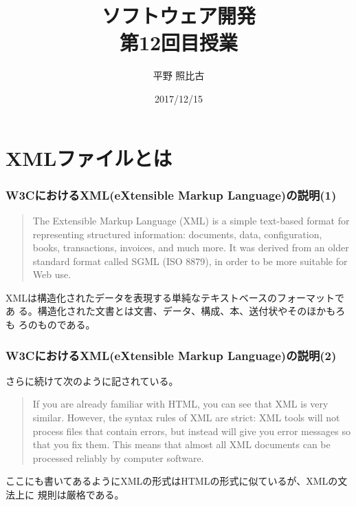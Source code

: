 
\title{ソフトウェア開発\\第12回目授業}
\author{平野 照比古}
\institute{}
\date{2017/12/15}
\newtheorem{Prob}{解説}
\newcommand{\Elm}[1]{\texttt{<#1>}}

\newcommand{\DOMM}{\texttt}
\newcommand{\Event}{\texttt}
\newcommand{\DOMP}{\texttt}
\newcommand{\DOM}{\texttt{DOM}}
\newcommand{\keyitem}{\relax}
\newcommand{\HTML}{HTML文書}

\frame{\maketitle}
\section{XMLファイルとは}
 \begin{frame}[containsverbatim]
  \frametitle{W3CにおけるXML(eXtensible Markup Language)の説明(1)}
\begin{quote}
 The Extensible Markup Language (XML) is a simple text-based format for
 representing structured information: documents, data, configuration,
 books, transactions, invoices, and much more. It was derived from an
 older standard format called SGML (ISO 8879), in order to be more
 suitable for Web use. 
\end{quote}
XMLは構造化されたデータを表現する単純なテキストベースのフォーマットであ
る。構造化された文書とは文書、データ、構成、本、送付状やそのほかもろも
ろのものである。
\end{frame}
\begin{frame}[containsverbatim]
  \frametitle{W3CにおけるXML(eXtensible Markup Language)の説明(2)}

さらに続けて次のように記されている。
\begin{quote}
 If you are already familiar with HTML, you can see that XML is very
 similar. However, the syntax rules of XML are strict: XML tools will
 not process files that contain errors, but instead will give you error
 messages so that you fix them. This means that almost all XML documents
 can be processed reliably by computer software. 

\end{quote}
ここにも書いてあるようにXMLの形式はHTMLの形式に似ているが、XMLの文法上に
規則は厳格である。
\end{frame}

